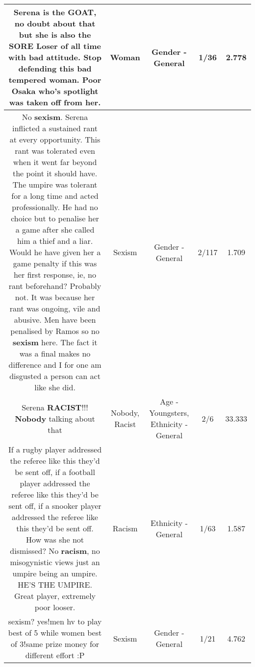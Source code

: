 \documentclass[11pt]{article}
\newlength\mylength
\begin{document}
\begin{center}
\begin{longtable}{|C{.65\mylength}|C{.30\mylength}|C{.12\mylength}|C{.12\mylength}|C{.12\mylength}|}
  \small Serena is the GOAT, no doubt about that but she is also the SORE Loser of all time with bad attitude. Stop defending this bad tempered \textbf{woman}. Poor Osaka who's spotlight was taken off from her.\normalsize   & Woman & Gender - General & 1/36 & 2.778 \\  \hline
  \small No \textbf{sexism}. Serena inflicted a sustained rant at every opportunity. This rant was tolerated even when it went far beyond the point it should have. The umpire was tolerant for a long time and acted professionally. He had no choice but to penalise her a game after she called him a thief and a liar. Would he have given her a game penalty if this was her first response, ie, no rant beforehand? Probably not. It was because her rant was ongoing, vile and abusive. Men have been penalised by Ramos so no \textbf{sexism} here. The fact it was a final makes no difference and I for one am disgusted a person can act like she did.\normalsize   & Sexism & Gender - General & 2/117 & 1.709 \\  \hline
  \small Serena \textbf{RACIST}!!! \textbf{Nobody} talking about that\normalsize   & Nobody, Racist & Age - Youngsters, Ethnicity - General & 2/6 & 33.333 \\  \hline
  \small If a rugby player addressed the referee like this they'd be sent off, if a football player addressed the referee like this they'd be sent off, if a snooker player addressed the referee like this they'd be sent off. How was she not dismissed? No \textbf{racism}, no misogynistic views just an umpire being an umpire. HE'S THE UMPIRE. Great player, extremely poor looser.\normalsize   & Racism & Ethnicity - General & 1/63 & 1.587 \\  \hline
  \small sexism? yes!men hv to play best of 5 while women best of 3!same prize money for different effort :P\normalsize   & Sexism & Gender - General & 1/21 & 4.762 \\  \hline

\end{longtable}
\end{center}
\end{document}

